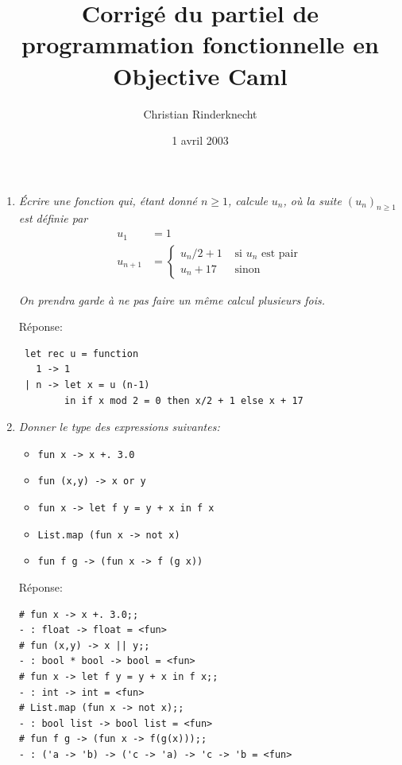 \documentclass[a4paper]{article}
\title{Corrigé du partiel de programmation fonctionnelle en Objective
       Caml}
\author{Christian Rinderknecht}
\date{1\ier{} avril 2003}
\begin{document}
\maketitle


\begin{enumerate}

  \item \emph{Écrire une fonction qui, étant donné $n\geq 1$, calcule
        $u_n$, où la suite $(u_n)_{n\geq 1}$ est définie par}
        \begin{align*}
        u_1 & = 1 \\
        u_{n+1} & = \left\{
                      \begin{array}{ll}
                        u_n/2 + 1 & \text{\ si $u_n$ est pair} \\
                        u_n + 17 & \text{\ sinon}
                      \end{array}
                    \right.
        \end{align*}

        \emph{On prendra garde à ne pas faire un même calcul plusieurs
        fois.}

        Réponse:

        \begin{verbatim}
 let rec u = function
   1 -> 1
 | n -> let x = u (n-1)
        in if x mod 2 = 0 then x/2 + 1 else x + 17
        \end{verbatim}


  \item \emph{Donner le type des expressions suivantes:}

        \begin{itemize}
          \item \verb/fun x -> x +. 3.0/
          \item \verb/fun (x,y) -> x or y/
          \item \verb/fun x -> let f y = y + x in f x/
          \item \verb/List.map (fun x -> not x)/
          \item \verb/fun f g -> (fun x -> f (g x))/
        \end{itemize}

        Réponse:

\begin{verbatim}
# fun x -> x +. 3.0;;
- : float -> float = <fun>
# fun (x,y) -> x || y;;
- : bool * bool -> bool = <fun>
# fun x -> let f y = y + x in f x;;
- : int -> int = <fun>
# List.map (fun x -> not x);;
- : bool list -> bool list = <fun>
# fun f g -> (fun x -> f(g(x)));;
- : ('a -> 'b) -> ('c -> 'a) -> 'c -> 'b = <fun>
\end{verbatim}


\end{enumerate}
\end{document}
